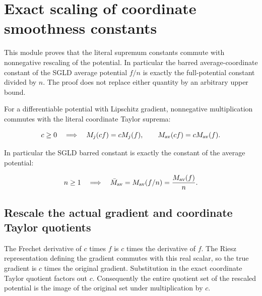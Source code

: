 \documentclass[11pt,a4paper]{report}
\begin{document}
\section{\texorpdfstring{Exact scaling of coordinate smoothness constants}{Exact scaling of coordinate smoothness constants}}
\label{proof-module-AverageLMC-SmoothnessScaling-lean}


This module proves that the literal supremum constants commute with nonnegative rescaling of the potential. In particular the barred average-coordinate constant of the SGLD average potential \(f/n\) is exactly the full-potential constant divided by \(n\). The proof does not replace either quantity by an arbitrary upper bound.



For a differentiable potential with Lipschitz gradient, nonnegative multiplication commutes with the literal coordinate Taylor suprema:

\[c\ge0\quad\Longrightarrow\quad M_j(cf)=cM_j(f),\qquad M_{\rm av}(cf)=cM_{\rm av}(f).\]

In particular the SGLD barred constant is exactly the constant of the average potential:

\[n\ge1\quad\Longrightarrow\quad \bar M_{\rm av}=M_{\rm av}(f/n)=\frac{M_{\rm av}(f)}{n}.\]\subsection{\texorpdfstring{Rescale the actual gradient and coordinate Taylor quotients}{Rescale the actual gradient and coordinate Taylor quotients}}
\label{report-step-AverageLMC-SmoothnessScaling-lean-1}


The Frechet derivative of \(c\) times \(f\) is \(c\) times the derivative of \(f\). The Riesz representation defining the gradient commutes with this real scalar, so the true gradient is \(c\) times the original gradient. Substitution in the exact coordinate Taylor quotient factors out \(c\). Consequently the entire quotient set of the rescaled potential is the image of the original set under multiplication by \(c\).
\end{document}
